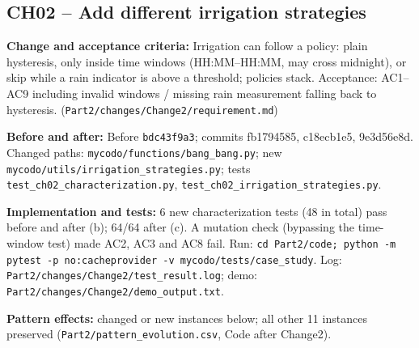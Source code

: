 \documentclass[11pt,a4paper]{article}
\newcommand{\field}[2]{\textbf{#1:} #2\par}
\begin{document}
\subsection*{CH02 -- Add different irrigation strategies}
\field{Change and acceptance criteria}{Irrigation can follow a policy: plain hysteresis, only inside time windows (HH:MM--HH:MM, may cross midnight), or skip while a rain indicator is above a threshold; policies stack. Acceptance: AC1--AC9 including invalid windows / missing rain measurement falling back to hysteresis. (\texttt{Part2/\allowbreak{}changes/\allowbreak{}Change2/\allowbreak{}requirement.\allowbreak{}md})}
\field{Before and after}{Before \texttt{bdc43f9a3}; commits fb1794585, c18ecb1e5, 9e3d56e8d. Changed paths: \texttt{mycodo/\allowbreak{}functions/\allowbreak{}bang\_\allowbreak{}bang.\allowbreak{}py}; new \texttt{mycodo/\allowbreak{}utils/\allowbreak{}irrigation\_\allowbreak{}strategies.\allowbreak{}py}; tests \texttt{test\_\allowbreak{}ch02\_\allowbreak{}characterization.\allowbreak{}py}, \texttt{test\_\allowbreak{}ch02\_\allowbreak{}irrigation\_\allowbreak{}strategies.\allowbreak{}py}.}
\field{Implementation and tests}{6 new characterization tests (48 in total) pass before and after (b); 64/64 after (c). A mutation check (bypassing the time-window test) made AC2, AC3 and AC8 fail. Run: \texttt{cd Part2/\allowbreak{}code; python -m pytest -p no:cacheprovider -v mycodo/\allowbreak{}tests/\allowbreak{}case\_\allowbreak{}study}. Log: \texttt{Part2/\allowbreak{}changes/\allowbreak{}Change2/\allowbreak{}test\_\allowbreak{}result.\allowbreak{}log}; demo: \texttt{Part2/\allowbreak{}changes/\allowbreak{}Change2/\allowbreak{}demo\_\allowbreak{}output.\allowbreak{}txt}.}
\field{Pattern effects}{changed or new instances below; all other 11 instances preserved (\texttt{Part2/\allowbreak{}pattern\_\allowbreak{}evolution.\allowbreak{}csv}, Code after Change2).}
\end{document}

